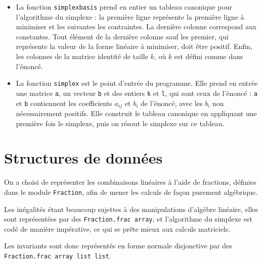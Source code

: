 \documentclass[a4paper]{article}
\begin{document}
\begin{itemize}
  \item La fonction \texttt{simplex\textunderscore basis} prend en entier un tableau canonique pour l'algorithme du simplexe : la première ligne représente la première ligne à minimiser et les suivantes les contraintes. La dernière colonne correspond aux constantes. Tout élément de la dernière colonne sauf les premier, qui représente la valeur de la forme linéaire à minimiser, doit être positif. Enfin, les colonnes de la matrice identité de taille $k$, où $k$ est défini comme dans l'énoncé.
  \item La fonction \texttt{simplex} est le point d'entrée du programme. Elle prend en entrée une matrice \texttt{a}, un vecteur \texttt{b} et des entiers \texttt{k} et \texttt{l}, qui sont ceux de l'énoncé : \texttt{a} et \texttt{b} contiennent les coefficients $a_{ij}$ et $b_i$ de l'énoncé, avec les $b_i$ non nécessairement positifs. Elle construit le tableau canonique en appliquant une première fois le simplexe, puis on résout le simplexe sur ce tableau.
\end{itemize}

\section{Structures de données}

On a choisi de représenter les combinaisons linéaires à l'aide de fractions, définies dans le module \texttt{Fraction}, afin de mener les calculs de façon purement algébrique.

Les inégalités étant beaucoup sujettes à des manipulations d'algèbre linéaire, elles sont représentées par des \texttt{Fraction.frac array}, et l'algorithme du simplexe est codé de manière impérative, ce qui se prête mieux aux calculs matriciels.

Les invariants sont donc représentés en forme normale disjonctive par des \texttt{Fraction.frac array list list}.
\end{document}
